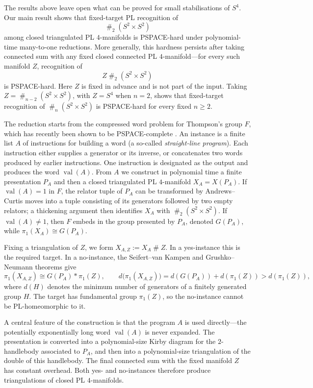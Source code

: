 \documentclass[a4paper,11pt,reqno]{amsart}
\theoremstyle{definition}
\theoremstyle{remark}
\DeclareMathOperator{\val}{val}
\newcommand{\cs}{\mathbin{\#}}
\begin{document}
	The results above leave open what can be proved for small stabilisations of $S^4$. Our main result shows that fixed-target PL recognition of
	\[
	\cs_2(S^2\times S^2)
	\]
	among closed triangulated PL $4$-manifolds is PSPACE-hard under polynomial-time many-to-one reductions. More generally, this hardness persists after taking connected sum with any fixed closed connected PL $4$-manifold---for every such manifold $Z$, recognition of
	\[
	Z\cs_2(S^2\times S^2)
	\]
	is PSPACE-hard. Here $Z$ is fixed in advance and is not part of the input. Taking $Z=\cs_{n-2}(S^2\times S^2)$, with $Z=S^4$ when $n=2$, shows that fixed-target recognition of $\cs_n(S^2\times S^2)$ is PSPACE-hard for every fixed $n\geq2$.
	
	The reduction starts from the compressed word problem for Thompson’s group $F$, which has recently been shown to be PSPACE-complete \cite{BFLaW}. An instance is a finite list $A$ of instructions for building a word (a so-called \emph{straight-line program}). Each instruction either supplies a generator or its inverse, or concatenates two words produced by earlier instructions. One instruction is designated as the output and produces the word $\val(A)$. From $A$ we construct in polynomial time a finite presentation $P_A$ and then a closed triangulated PL $4$-manifold $X_A=X(P_A)$. If $\val(A)=1$ in $F$, the relator tuple of $P_A$ can be transformed by Andrews--Curtis moves into a tuple consisting of its generators followed by two empty relators; a thickening argument then identifies $X_A$ with $\cs_2(S^2\times S^2)$. If $\val(A)\ne1$, then $F$ embeds in the group presented by $P_A$, denoted $G(P_A)$, while $\pi_1(X_A)\cong G(P_A)$.
	
	Fixing a triangulation of $Z$, we form $X_{A,Z}:=X_A\cs Z$. In a yes-instance this is the required target. In a no-instance, the Seifert--van Kampen and Grushko--Neumann theorems give
	\[
	\pi_1(X_{A,Z})\cong G(P_A)*\pi_1(Z),
	\qquad
	d\bigl(\pi_1(X_{A,Z})\bigr)=d(G(P_A))+d(\pi_1(Z))>d(\pi_1(Z)),
	\]
	where $d(H)$ denotes the minimum number of generators of a finitely generated group $H$. The target has fundamental group $\pi_1(Z)$, so the no-instance cannot be PL-homeomorphic to it.
	
	A central feature of the construction is that the program $A$ is used directly---the potentially exponentially long word $\val(A)$ is never expanded. The presentation is converted into a polynomial-size Kirby diagram for the $2$-handlebody associated to $P_A$, and then into a polynomial-size triangulation of the double of this handlebody. The final connected sum with the fixed manifold $Z$ has constant overhead. Both yes- and no-instances therefore produce triangulations of closed PL $4$-manifolds.
	
\end{document}
